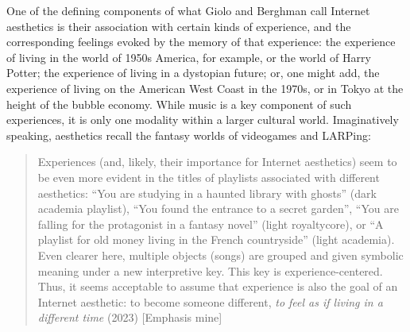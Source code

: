 \documentclass[
  letterpaper,
  DIV=11,
  numbers=noendperiod,
  oneside]{scrartcl}
\begin{document}

One of the defining components of what Giolo and Berghman call Internet
aesthetics is their association with certain kinds of experience, and
the corresponding feelings evoked by the memory of that experience: the
experience of living in the world of 1950s America, for example, or the
world of Harry Potter; the experience of living in a dystopian future;
or, one might add, the experience of living on the American West Coast
in the 1970s, or in Tokyo at the height of the bubble economy. While
music is a key component of such experiences, it is only one modality
within a larger cultural world. Imaginatively speaking, aesthetics
recall the fantasy worlds of videogames and LARPing:

\begin{quote}
Experiences (and, likely, their importance for Internet aesthetics) seem
to be even more evident in the titles of playlists associated with
different aesthetics: ``You are studying in a haunted library with
ghosts'' (dark academia playlist), ``You found the entrance to a secret
garden'', ``You are falling for the protagonist in a fantasy novel''
(light royaltycore), or ``A playlist for old money living in the French
countryside'' (light academia). Even clearer here, multiple objects
(songs) are grouped and given symbolic meaning under a new interpretive
key. This key is experience-centered. Thus, it seems acceptable to
assume that experience is also the goal of an Internet aesthetic: to
become someone different, \emph{to feel as if living in a different
time} (2023) {[}Emphasis mine{]}
\end{quote}
\end{document}
